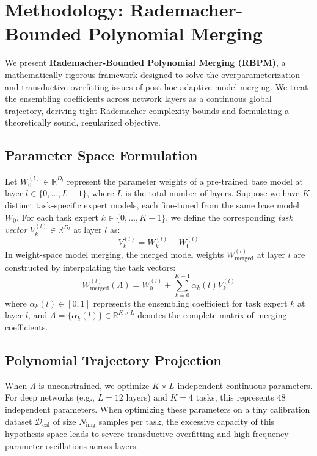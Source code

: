 \section{Methodology: Rademacher-Bounded Polynomial Merging}
\label{sec:method}

We present \textbf{Rademacher-Bounded Polynomial Merging (RBPM)}, a mathematically rigorous framework designed to solve the overparameterization and transductive overfitting issues of post-hoc adaptive model merging. We treat the ensembling coefficients across network layers as a continuous global trajectory, deriving tight Rademacher complexity bounds and formulating a theoretically sound, regularized objective.

\subsection{Parameter Space Formulation}
Let $W_0^{(l)} \in \mathbb{R}^{D_l}$ represent the parameter weights of a pre-trained base model at layer $l \in \{0, \dots, L-1\}$, where $L$ is the total number of layers. Suppose we have $K$ distinct task-specific expert models, each fine-tuned from the same base model $W_0$. For each task expert $k \in \{0, \dots, K-1\}$, we define the corresponding \emph{task vector} $V_k^{(l)} \in \mathbb{R}^{D_l}$ at layer $l$ as:
\begin{equation}
V_k^{(l)} = W_k^{(l)} - W_0^{(l)}
\end{equation}
In weight-space model merging, the merged model weights $W_{\text{merged}}^{(l)}$ at layer $l$ are constructed by interpolating the task vectors:
\begin{equation}
W_{\text{merged}}^{(l)}(\Lambda) = W_0^{(l)} + \sum_{k=0}^{K-1} \alpha_k(l) V_k^{(l)}
\end{equation}
where $\alpha_k(l) \in [0, 1]$ represents the ensembling coefficient for task expert $k$ at layer $l$, and $\Lambda = \{\alpha_k(l)\} \in \mathbb{R}^{K \times L}$ denotes the complete matrix of merging coefficients.

\subsection{Polynomial Trajectory Projection}
When $\Lambda$ is unconstrained, we optimize $K \times L$ independent continuous parameters. For deep networks (e.g., $L = 12$ layers) and $K = 4$ tasks, this represents $48$ independent parameters. When optimizing these parameters on a tiny calibration dataset $\mathcal{D}_{\text{cal}}$ of size $N_{\text{img}}$ samples per task, the excessive capacity of this hypothesis space leads to severe transductive overfitting and high-frequency parameter oscillations across layers.

